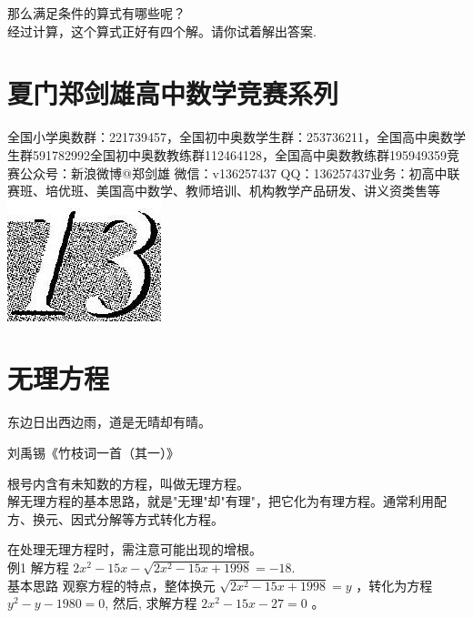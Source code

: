 \documentclass[10pt]{article}
\begin{document}
那么满足条件的算式有哪些呢？\\
经过计算，这个算式正好有四个解。请你试着解出答案.

\section*{夏门郑剑雄高中数学竞赛系列}
全国小学奥数群：221739457，全国初中奥数学生群：253736211，全国高中奥数学生群591782992全国初中奥数教练群112464128，全国高中奥数教练群195949359竞赛公众号：新浪微博@郑剑雄 微信：v136257437 QQ：136257437业务：初高中联赛班、培优班、美国高中数学、教师培训、机构教学产品研发、讲义资类售等\\
\includegraphics[max width=\textwidth, center]{2024_10_30_26b590fd1106d28139f0g-081}

\section*{无理方程}
东边日出西边雨，道是无晴却有晴。

刘禹锡《竹枝词一首（其一）》

根号内含有未知数的方程，叫做无理方程。\\
解无理方程的基本思路，就是"无理"却"有理"，把它化为有理方程。通常利用配方、换元、因式分解等方式转化方程。

在处理无理方程时，需注意可能出现的增根。\\
例1 解方程 $2 x^{2}-15 x-\sqrt{2 x^{2}-15 x+1998}=-18$.\\
基本思路 观察方程的特点，整体换元 $\sqrt{2 x^{2}-15 x+1998}=y$ ，转化为方程 $y^{2}-y-1980=0$, 然后, 求解方程 $2 x^{2}-15 x-27=0$ 。
\end{document}
